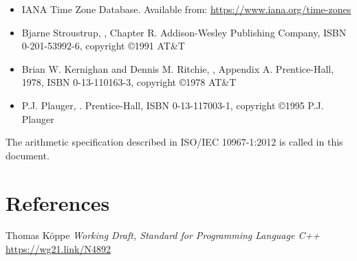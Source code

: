 \documentclass{wg21}
\begin{document}
\begin{itemize}
    \item
    IANA Time Zone Database.
    Available from: \url{https://www.iana.org/time-zones}
    \item
    Bjarne Stroustrup,
    , Chapter R.
    Addison-Wesley Publishing Company, ISBN 0-201-53992-6, copyright \copyright 1991 AT\&T
    \item
    Brian W. Kernighan and Dennis M. Ritchie,
    , Appendix A.
    Prentice-Hall, 1978, ISBN 0-13-110163-3, copyright \copyright 1978 AT\&T
    \item
    P.J. Plauger,
    .
    Prentice-Hall, ISBN 0-13-117003-1, copyright \copyright 1995 P.J. Plauger
\end{itemize}

The arithmetic specification described in ISO/IEC 10967-1:2012 is
called  in this document.



\section{References}

\renewcommand{\section}[2]{}%



\begin{thebibliography}{9}

Thomas Köppe
\emph{Working Draft, Standard for Programming Language C++}\newline
\url{https://wg21.link/N4892}


\end{thebibliography}
\end{document}
